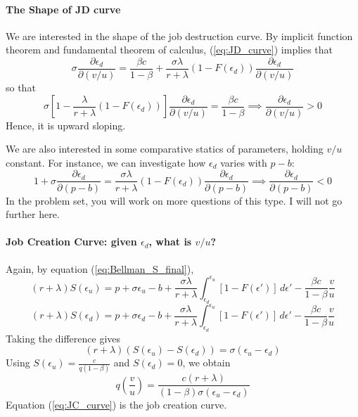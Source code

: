 \documentclass[12pt]{article}
\begin{document}
\paragraph{The Shape of JD curve \\ [6pt]}
We are interested in the shape of the job destruction curve. By implicit function theorem and fundamental theorem of calculus, (\ref{eq:JD_curve}) implies that
\[\sigma \frac{\partial \epsilon_d}{\partial (v/u)} = \frac{\beta c}{1-\beta} + \frac{\sigma \lambda}{r + \lambda} (1-F(\epsilon_d)) \frac{\partial \epsilon_d}{\partial (v/u)} \]
so that
\[\sigma \left[1 -  \frac{ \lambda}{r + \lambda} (1-F(\epsilon_d))\right]\frac{\partial \epsilon_d}{\partial (v/u)} = \frac{\beta c}{1 - \beta} \implies \frac{\partial \epsilon_d}{\partial (v/u)} > 0 \]
Hence, it is upward sloping. 

We are also interested in some comparative statics of parameters, holding $v/u$ constant. For instance, we can investigate how $\epsilon_d$ varies with $p-b$:
\[1 + \sigma \frac{\partial \epsilon_d}{\partial (p-b)} = \frac{\sigma \lambda}{r + \lambda} (1-F(\epsilon_d))\frac{\partial \epsilon_d}{\partial (p-b)} \implies \frac{\partial \epsilon_d}{\partial (p-b)} < 0\]
In the problem set, you will work on more questions of this type. I will not go further here.

\paragraph{Job Creation Curve: given $\epsilon_d$, what is $v/u$? \\ [6pt]}

Again, by equation (\ref{eq:Bellman_S_final}),
\[(r+\lambda) S(\epsilon_u) = p + \sigma \epsilon_u - b + \frac{\sigma \lambda}{r + \lambda} \int_{\epsilon_d}^{\epsilon_u} [1- F(\epsilon')] \, d\epsilon' - \frac{\beta c}{1-\beta} \frac{v}{u}\]
\[(r+\lambda) S(\epsilon_d) = p + \sigma \epsilon_d - b + \frac{\sigma \lambda}{r + \lambda} \int_{\epsilon_d}^{\epsilon_u} [1- F(\epsilon')] \, d\epsilon' - \frac{\beta c}{1-\beta} \frac{v}{u}\]
Taking the difference gives
\begin{equation}
	(r+\lambda) (S(\epsilon_u) - S(\epsilon_d)) = \sigma (\epsilon_u - \epsilon_d)
\end{equation}
Using $S(\epsilon_u) = \frac{c}{q(1-\beta)}$ and $S(\epsilon_d) = 0$, we obtain
\begin{equation} \label{eq:JC_curve}
	q\left(\frac{v}{u}\right) = \frac{c(r+\lambda)}{(1-\beta) \sigma (\epsilon_u - \epsilon_d)}
\end{equation} 
Equation (\ref{eq:JC_curve}) is the job creation curve.
\end{document}
